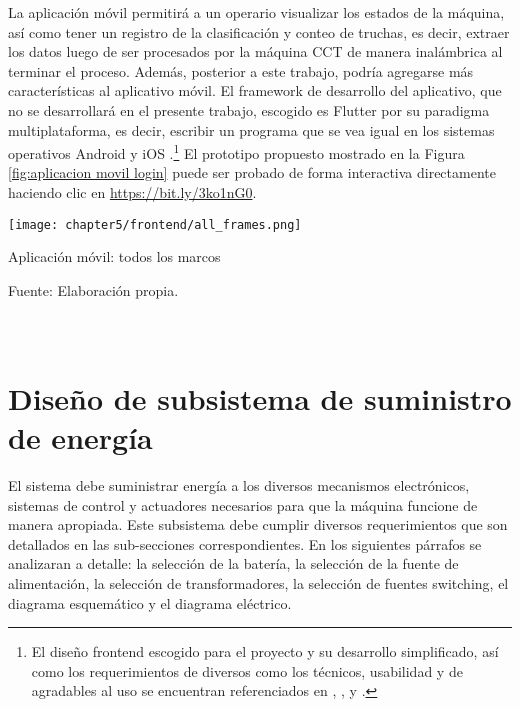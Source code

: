 La aplicación móvil permitirá a un operario visualizar los estados de la máquina, así como tener un registro de la clasificación y conteo de truchas, es decir, extraer los datos luego de ser procesados por la máquina CCT de manera inalámbrica al terminar el proceso. Además, posterior a este trabajo, podría agregarse más características al aplicativo móvil. El framework de desarrollo del aplicativo, que no se desarrollará en el presente trabajo, escogido es Flutter por su paradigma multiplataforma, es decir, escribir un programa que se vea igual en los sistemas operativos Android y iOS \cite{Simone2020}.\footnote{El diseño frontend escogido para el proyecto y su desarrollo simplificado, así como los requerimientos de diversos como los técnicos, usabilidad y de agradables al uso se encuentran referenciados en \cite{Joekman2010}, \cite{PrajyotMainkar2019}, \cite{Churchill2016} y \cite{Neil2012}.} El prototipo propuesto mostrado en la Figura \ref{fig:aplicacion movil login} puede ser probado de forma interactiva directamente haciendo clic en \href{https://bit.ly/3ko1nG0}{https://bit.ly/3ko1nG0}.

\begin{myfigure}[H]
	\footnotesize\centering
	\texttt{[image: chapter5/frontend/all\_frames.png]}
	\caption{Aplicación móvil: todos los marcos}
	\begin{myflushcenter}
		Fuente: Elaboración propia.
	\end{myflushcenter}
	\label{fig:aplicacion movil login}
\end{myfigure}

\pagestyle{myportland}
\doublespacing
\chapter[\quad\quad\quad\quad ----- Diseño de subsistema de suministro de energía]{\\ Diseño de subsistema de suministro de energía}
\thispagestyle{myportland}
\label{ssec:diseno de subsistema de suministro de energia}

El sistema debe suministrar energía a los diversos mecanismos electrónicos, sistemas de control y actuadores necesarios para que la máquina funcione de manera apropiada. Este subsistema debe cumplir diversos requerimientos que son detallados en las sub-secciones correspondientes. En los siguientes párrafos se analizaran a detalle: la selección de la batería, la selección de la fuente de alimentación, la selección de transformadores, la selección de fuentes switching, el diagrama esquemático y el diagrama eléctrico. %

